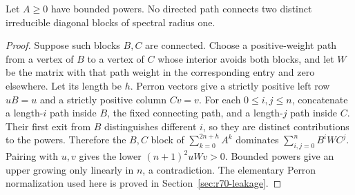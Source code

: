 \begin{lemma}\label{lem:r72-critical}
Let $A\ge0$ have bounded powers. No directed path connects two distinct irreducible diagonal blocks of spectral radius one.
\end{lemma}
\begin{proof}
Suppose such blocks $B,C$ are connected. Choose a positive-weight path from a vertex of $B$ to a vertex of $C$ whose interior avoids both blocks, and let $W$ be the matrix with that path weight in the corresponding entry and zero elsewhere. Let its length be $h$. Perron vectors give a strictly positive left row $uB=u$ and a strictly positive column $Cv=v$. For each $0\le i,j\le n$, concatenate a length-$i$ path inside $B$, the fixed connecting path, and a length-$j$ path inside $C$. Their first exit from $B$ distinguishes different $i$, so they are distinct contributions to the powers. Therefore the $B,C$ block of $\sum_{k=0}^{2n+h}A^k$ dominates $\sum_{i,j=0}^nB^iWC^j$. Pairing with $u,v$ gives the lower $(n+1)^2uWv>0$. Bounded powers give an upper growing only linearly in $n$, a contradiction. The elementary Perron normalization used here is proved in Section~\ref{sec:r70-leakage}.
\end{proof}

